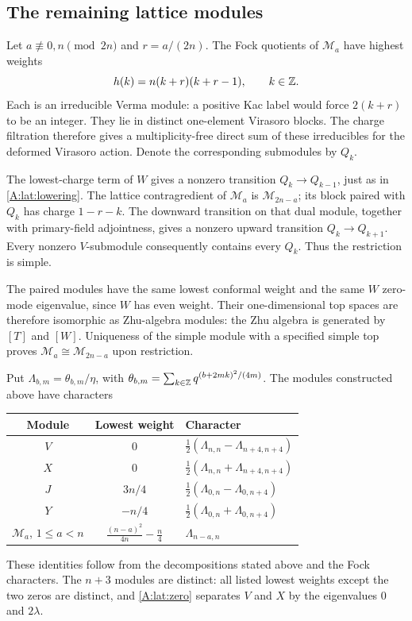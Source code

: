 \documentclass[11pt]{article}
\numberwithin{equation}{section}
\begin{document}
\subsection{The remaining lattice modules}
Let $a\not\equiv0,n\pmod{2n}$ and $r=a/(2n)$. The Fock quotients of $\mathcal M_a$ have highest weights
\[
 h(k)=n(k+r)(k+r-1),\qquad k\in\mathbb Z.
\]
Each is an irreducible Verma module: a positive Kac label would force $2(k+r)$ to be an integer. They lie in distinct one-element Virasoro blocks. The charge filtration therefore gives a multiplicity-free direct sum of these irreducibles for the deformed Virasoro action. Denote the corresponding submodules by $Q_k$.

The lowest-charge term of $W$ gives a nonzero transition $Q_k\to Q_{k-1}$, just as in \eqref{A:lat:lowering}. The lattice contragredient of $\mathcal M_a$ is $\mathcal M_{2n-a}$; its block paired with $Q_k$ has charge $1-r-k$. The downward transition on that dual module, together with primary-field adjointness, gives a nonzero upward transition $Q_k\to Q_{k+1}$. Every nonzero $V$-submodule consequently contains every $Q_k$. Thus the restriction is simple.

The paired modules have the same lowest conformal weight and the same $W$ zero-mode eigenvalue, since $W$ has even weight. Their one-dimensional top spaces are therefore isomorphic as Zhu-algebra modules: the Zhu algebra is generated by $[T]$ and $[W]$. Uniqueness of the simple module with a specified simple top proves $\mathcal M_a\cong \mathcal M_{2n-a}$ upon restriction.

Put $\Lambda_{b,m}=\theta_{b,m}/\eta$, with
$\theta_{b,m}=\sum_{k\in\mathbb Z}q^{(b+2mk)^2/(4m)}$. The modules constructed above have characters
\begin{center}
\begin{tabular}{ccl}
\toprule
Module & Lowest weight & Character\\
\midrule
$V$ & $0$ & $\frac12(\Lambda_{n,n}-\Lambda_{n+4,n+4})$\\[3pt]
$X$ & $0$ & $\frac12(\Lambda_{n,n}+\Lambda_{n+4,n+4})$\\[3pt]
$J$ & $3n/4$ & $\frac12(\Lambda_{0,n}-\Lambda_{0,n+4})$\\[3pt]
$Y$ & $-n/4$ & $\frac12(\Lambda_{0,n}+\Lambda_{0,n+4})$\\[3pt]
$\mathcal M_a$, $1\leq a<n$ & $\frac{(n-a)^2}{4n}-\frac n4$ & $\Lambda_{n-a,n}$\\
\bottomrule
\end{tabular}
\end{center}
These identities follow from the decompositions stated above and the Fock characters. The $n+3$ modules are distinct: all listed lowest weights except the two zeros are distinct, and \eqref{A:lat:zero} separates $V$ and $X$ by the eigenvalues $0$ and $2\lambda$.
\end{document}
